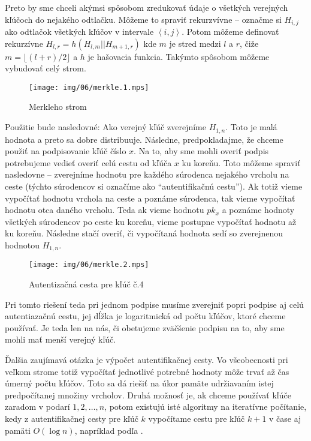 Preto by sme chceli akýmsi spôsobom zredukovať údaje o všetkých
verejných kľúčoch do nejakého odtlačku. Môžeme to spraviť rekurzvívne
-- označme si $H_{i,j}$ ako odtlačok všetkých kľúčov v intervale 
$\left<i,j\right>$.
Potom môžeme definovať rekurzívne $H_{l,r}=h(H_{l,m} || H_{m+1,r})$ kde
$m$ je stred medzi $l$ a $r$, čiže $m=\lfloor (l+r)/2 \rfloor$ a
$h$ je hašovacia funkcia. Takýmto spôsobom môžeme vybudovať celý
strom.
\begin{figure}[h]
    \centering
    \texttt{[image: img/06/merkle.1.mps]}
    \caption{Merkleho strom}
    \label{fig:merkle}
\end{figure}

Použitie bude nasledovné: Ako verejný kľúč zverejníme $H_{1,n}$. Toto je
malá hodnota a preto sa dobre distribuuje. Následne, predpokladajme, že
chceme použiť na podpisovanie kľúč číslo $x$. Na to, aby sme mohli overiť
podpis potrebujeme vedieť overiť celú cestu od kľúča $x$ ku koreňu. Toto
môžeme spraviť nasledovne -- zverejníme hodnotu pre každého súrodenca
nejakého vrcholu na ceste (týchto súrodencov si označíme ako
``autentifikačnú cestu'').
Ak totiž vieme vypočítať hodnotu vrchola na ceste a poznáme
súrodenca, tak vieme vypočítať hodnotu otca daného vrcholu.
Teda ak vieme hodnotu $pk_x$ a poznáme hodnoty všetkých súrodencov po ceste ku
koreňu, vieme postupne vypočítať hodnotu až ku koreňu. Následne stačí
overiť, či vypočítaná hodnota sedí so zverejnenou hodnotou $H_{1,n}$.

\begin{figure}[h]
    \centering
    \texttt{[image: img/06/merkle.2.mps]}
    \caption{Autentizačná cesta pre kľúč č.4}
\end{figure}

Pri tomto riešení teda pri jednom podpise musíme zverejniť popri podpise aj
celú autentiazačnú cestu, jej dĺžka je logaritmická od počtu kľúčov, ktoré
chceme používať. Je teda len na nás, či obetujeme zväčšenie podpisu na to,
aby sme mohli mať menší verejný kľúč.

Ďalšia zaujímavá otázka je výpočet autentifikačnej cesty. Vo všeobecnosti
pri veľkom strome totiž vypočítať jednotlivé potrebné hodnoty môže trvať až
čas úmerný počtu kľúčov. Toto sa dá riešiť na úkor pamäte udržiavaním istej
predpočítanej množiny vrcholov. Druhá možnosť je, ak chceme používať kľúče
zaradom v podarí $1,2,\dots,n$, potom existujú isté algoritmy na iteratívne
počítanie, kedy z autentifikačnej cesty pre kľúč $k$ vypočítame cestu pre
kľúč $k+1$ v čase aj pamäti $O(\log n)$, napríklad podľa \cite{merkle_iter}.

